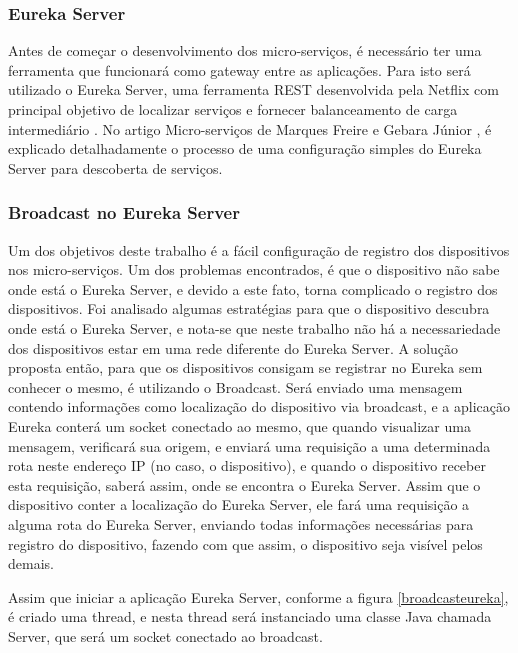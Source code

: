 \documentclass[journal]{IEEEtran}
\begin{document}
\subsubsection{Eureka Server}

Antes de começar o desenvolvimento dos micro-serviços, é necessário ter uma ferramenta que funcionará como gateway entre as aplicações. Para isto será utilizado o Eureka Server, uma ferramenta REST desenvolvida pela Netflix com principal objetivo de localizar serviços e fornecer balanceamento de carga intermediário \cite{eurekanetflix}. No artigo Micro-serviços de Marques Freire e Gebara Júnior \cite[p.~6]{freiregebaramicroservico}, é explicado detalhadamente o processo de uma configuração simples do Eureka Server para descoberta de serviços.

\subsubsection{Broadcast no Eureka Server}

Um dos objetivos deste trabalho é a fácil configuração de registro dos dispositivos nos micro-serviços. Um dos problemas encontrados, é que o dispositivo não sabe onde está o Eureka Server, e devido a este fato, torna complicado o registro dos dispositivos. Foi analisado algumas estratégias para que o dispositivo descubra onde está o Eureka Server, e nota-se que neste trabalho não há a necessariedade dos dispositivos estar em uma rede diferente do Eureka Server. A solução proposta então, para que os dispositivos consigam se registrar no Eureka sem conhecer o mesmo, é utilizando o Broadcast. Será enviado uma mensagem contendo informações como localização do dispositivo via broadcast, e a aplicação Eureka conterá um socket conectado ao mesmo, que quando visualizar uma mensagem, verificará sua origem, e enviará uma requisição a uma determinada rota neste endereço IP (no caso, o dispositivo), e quando o dispositivo receber esta requisição, saberá assim, onde se encontra o Eureka Server. Assim que o dispositivo conter a localização do Eureka Server, ele fará uma requisição a alguma rota do Eureka Server, enviando todas informações necessárias para registro do dispositivo, fazendo com que assim, o dispositivo seja visível pelos demais.

Assim que iniciar a aplicação Eureka Server, conforme a figura \ref{broadcasteureka}, é criado uma thread, e nesta thread será instanciado uma classe Java chamada Server, que será um socket conectado ao broadcast.
\end{document}
